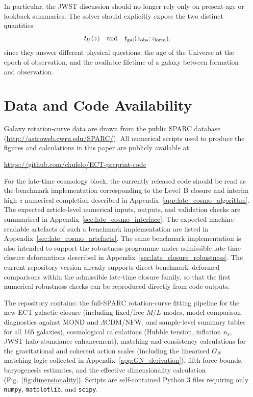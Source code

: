 \documentclass[11pt,a4paper]{article}
\numberwithin{equation}{section}
\begin{document}
In particular, the JWST discussion should no longer rely only on
present-age or lookback summaries.
The solver should explicitly expose the two distinct quantities
\[
t_U(z)
\quad\text{and}\quad
t_{\rm gal}(z_{\rm obs};z_{\rm form}),
\]
since they answer different physical questions: the age of the Universe
at the epoch of observation, and the available lifetime of a galaxy
between formation and observation.


\clearpage
\section*{Data and Code Availability}

Galaxy rotation-curve data are drawn from the public SPARC database \cite{Lelli2016}
(\url{http://astroweb.cwru.edu/SPARC/}).
All numerical scripts used to produce the figures and calculations in this paper
are publicly available at:

\begin{center}
  \url{https://github.com/chufelo/ECT-preprint-code}
\end{center}

\noindent
For the late-time cosmology block, the currently released code should be
read as the benchmark implementation corresponding to the Level~B
closure and interim high-$z$ numerical completion described in
Appendix~\ref{app:late_cosmo_algorithm}.
The expected article-level numerical inputs, outputs, and validation
checks are summarised in
Appendix~\ref{sec:late_cosmo_interface}.
The expected machine-readable artefacts of such a benchmark
implementation are listed in
Appendix~\ref{sec:late_cosmo_artefacts}.
The same benchmark implementation is also intended to support the
robustness programme under admissible late-time closure deformations
described in Appendix~\ref{sec:late_closure_robustness}.
The current repository version already supports direct benchmark--deformed
comparisons within the admissible late-time closure family, so that the
first numerical robustness checks can be reproduced directly from code
outputs.

\noindent
The repository contains: the full-SPARC rotation-curve fitting pipeline
for the new ECT galactic closure (including fixed/free $M/L$ modes,
model-comparison diagnostics against MOND and $\Lambda$CDM/NFW, and
sample-level summary tables for all 165 galaxies),
cosmological calculations (Hubble tension, inflation $n_s$, JWST halo-abundance
enhancement), matching and consistency calculations for the gravitational and
coherent action scales (including the linearised $G_N$ matching logic collected
in Appendix~\ref{app:GN_derivation}), fifth-force bounds, baryogenesis estimates,
and the effective dimensionality calculation (Fig.~\ref{fig:dimensionality}).
Scripts are self-contained Python 3 files requiring only \texttt{numpy},
\texttt{matplotlib}, and \texttt{scipy}.
\end{document}

